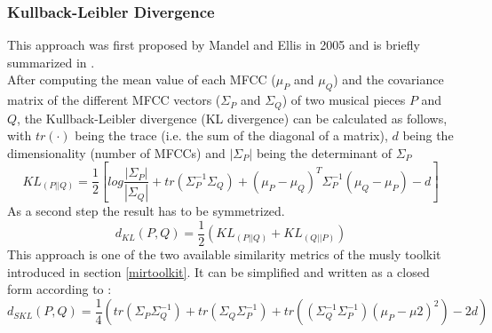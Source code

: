 \subsubsection{Kullback-Leibler Divergence}

This approach was first proposed by Mandel and Ellis \cite{mandelellis1} in 2005 and is briefly summarized in \cite[pp. 65f]{knees1}.\\
After computing the mean value of each MFCC ($\mu_P$ and $\mu_Q$) and the covariance matrix of the different MFCC vectors ($\Sigma_P$ and $\Sigma_Q$) of two musical pieces $P$ and $Q$, the Kullback-Leibler divergence (KL divergence) can be calculated as follows, with $tr(\cdot)$ being the trace (i.e. the sum of the diagonal of a matrix), $d$ being the dimensionality (number of MFCCs) and $|\Sigma_P|$ being the determinant of $\Sigma_P$\\
\begin{equation} \label{eq:KL1}
KL_{(P||Q)} = \frac{1}{2}[log\frac{|\Sigma_P|}{|\Sigma_Q|} + tr(\Sigma_P^{-1}\Sigma_Q) + (\mu_P - \mu_Q)^T \Sigma_P^{-1} (\mu_Q - \mu_P) - d]
\end{equation}
As a second step the result has to be symmetrized.
\begin{equation} \label{eq:KL2}
d_{KL}(P, Q) = \frac{1}{2} (KL_{(P||Q)} + KL_{(Q||P)}) 
\end{equation}
This approach is one of the two available similarity metrics of the musly \cite{musly1} toolkit introduced in section \ref{mirtoolkit}.
It can be simplified and written as a closed form according to \cite[p. 44]{schnitzer1}:
\begin{equation} \label{eq:SKL}
d_{SKL}(P, Q) = \frac{1}{4} (tr(\Sigma_P\Sigma_Q^{-1}) + tr(\Sigma_Q\Sigma_P^{-1}) + tr((\Sigma_Q^{-1}\Sigma_P^{-1})(\mu_P - \mu2)^2) - 2d)
\end{equation}

